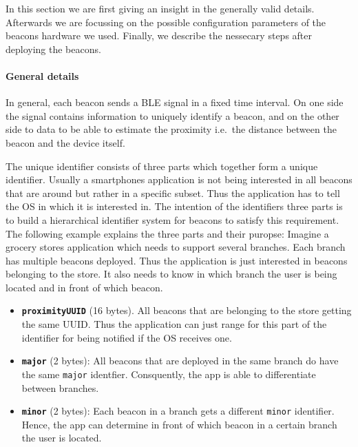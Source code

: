 In this section we are first giving an insight in the generally valid details.
Afterwards we are focussing on the possible configuration parameters of the beacons hardware we used.
Finally, we describe the nessecary steps after deploying the beacons.

\paragraph{General details} In general, each beacon sends a \acs{BLE} signal in a fixed time interval.
On one side the signal contains information to uniquely identify a beacon, and on the other side to data to be able to estimate the proximity i.e.\ the distance between the beacon and the device itself.

The unique identifier consists of three parts which together form a unique identifier. Usually a smartphones application is not being interested in all beacons that are around but rather in a specific subset. Thus the application has to tell the \acs{OS} in which it is interested in. The intention of the identifiers three parts is to build a hierarchical identifier system for beacons to satisfy this requirement. The following example explains the three parts and their puropse:
Imagine a grocery stores application which needs to support several branches.
Each branch has multiple beacons deployed.
Thus the application is just interested in beacons belonging to the store.
It also needs to know in which branch the user is being located and in front of which beacon.
\begin{itemize}
  \item \textbf{\texttt{proximityUUID}} (16 bytes). All beacons that are belonging to the store getting the same \acl{UUID}. Thus the application can just range for this part of the identifier for being notified if the \acs{OS} receives one.
  \item \textbf{\texttt{major}} (2 bytes): All beacons that are deployed in the same branch do have the same \texttt{major} identfier. Consquently, the app is able to differentiate between branches.
  \item \textbf{\texttt{minor}} (2 bytes): Each beacon in a branch gets a different \texttt{minor} identifier. Hence, the app can determine in front of which beacon in a certain branch the user is located.
\end{itemize}

